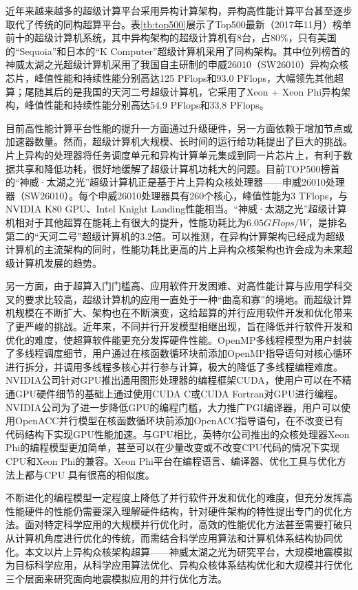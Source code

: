 近年来越来越多的超级计算平台采用异构计算架构\cite{buyya1999high}，异构高性能计算平台甚至逐步取代了传统的同构超算平台。表\ref{tb:top500}展示了Top500最新（2017年11月）榜单前十的超级计算机系统，其中异构架构的超级计算机有8台，占80\%，只有美国的“Sequoia”和日本的“K Computer”超级计算机采用了同构架构。其中位列榜首的神威太湖之光超级计算机采用了我国自主研制的申威26010（SW26010）异构众核芯片，峰值性能和持续性能分别高达125 PFlops和93.0 PFlops，大幅领先其他超算；尾随其后的是我国的天河二号超级计算机，它采用了Xeon + Xeon Phi异构架构，峰值性能和持续性能分别高达54.9 PFlops和33.8 PFlops。

目前高性能计算平台性能的提升一方面通过升级硬件，另一方面依赖于增加节点或加速器数量。然而，超级计算机大规模、长时间的运行给功耗提出了巨大的挑战\cite{reed2015exascale}。片上异构的处理器将任务调度单元和异构计算单元集成到同一片芯片上，有利于数据共享和降低功耗，很好地缓解了超级计算机功耗大的问题。目前TOP500榜首的“神威·太湖之光”超级计算机正是基于片上异构众核处理器\cite{fu2016sunway}——申威26010处理器（SW26010）。每个申威26010处理器具有260个核心，峰值性能为3 TFlops，与NVIDIA K80 GPU、Intel Knight Landing性能相当\cite{einkemmer2017evaluation,sodani2016knights}。“神威·太湖之光”超级计算机相对于其他超算在能耗上有很大的提升，性能功耗比为$6.05GFlops/W$，是排名第二的“天河二号”超级计算机的3.2倍。可以推测，在异构计算架构已经成为超级计算机的主流架构的同时，性能功耗比更高的片上异构众核架构也许会成为未来超级计算机发展的趋势。

另一方面，由于超算入门门槛高、应用软件开发困难、对高性能计算与应用学科交叉的要求比较高，超级计算机的应用一直处于一种“曲高和寡”的境地。而超级计算机规模在不断扩大、架构也在不断演变，这给超算的并行应用软件开发和优化带来了更严峻的挑战。近年来，不同并行开发模型相继出现，旨在降低并行软件开发和优化的难度，使超算软件能更充分发挥硬件性能。OpenMP多线程模型为用户封装了多线程调度细节，用户通过在核函数循环块前添加OpenMP指导语句对核心循环进行拆分，并调用多线程多核心并行参与计算，极大的降低了多线程编程难度。NVIDIA公司针对GPU推出通用图形处理器的编程框架CUDA\cite{cook2012cuda}，使用户可以在不精通GPU硬件细节的基础上通过使用CUDA C或CUDA Fortran对GPU进行编程。NVIDIA公司为了进一步降低GPU的编程门槛，大力推广PGI编译器，用户可以使用OpenACC并行模型在核函数循环块前添加OpenACC指导语句，在不改变已有代码结构下实现GPU性能加速。与GPU相比，英特尔公司推出的众核处理器Xeon Phi的编程模型更加简单，甚至可以在少量改变或不改变CPU代码的情况下实现CPU和Xeon Phi的兼容。Xeon Phi平台在编程语言、编译器、优化工具与优化方法上都与CPU 具有很高的相似度。

不断进化的编程模型一定程度上降低了并行软件开发和优化的难度，但充分发挥高性能硬件的性能仍需要深入理解硬件结构，针对硬件架构的特性提出专门的优化方法。面对特定科学应用的大规模并行优化时，高效的性能优化方法甚至需要打破只从计算机角度进行优化的传统，而需结合科学应用算法和计算机体系结构协同优化。本文以片上异构众核架构超算——神威太湖之光为研究平台，大规模地震模拟为目标科学应用，从科学应用算法优化、异构众核体系结构优化和大规模并行优化三个层面来研究面向地震模拟应用的并行优化方法。

